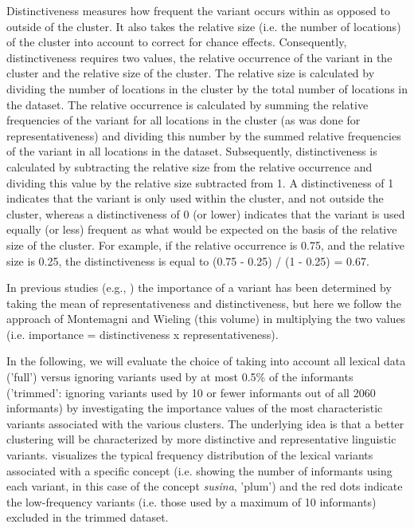 \documentclass[output=paper]{LSP/langsci}
\begin{document}
Distinctiveness measures how frequent the variant occurs within as opposed to outside of the cluster. It also takes the relative size (i.e. the number of locations) of the cluster into account to correct for chance effects. Consequently, distinctiveness requires two values, the relative occurrence of the variant in the cluster and the relative size of the cluster. The relative size is calculated by dividing the number of locations in the cluster by the total number of locations in the dataset. The relative occurrence is calculated by summing the relative frequencies of the variant for all locations in the cluster (as was done for representativeness) and dividing this number by the summed relative frequencies of the variant in all locations in the dataset. Subsequently, distinctiveness is calculated by subtracting the relative size from the relative occurrence and dividing this value by the relative size subtracted from 1. A distinctiveness of 1 indicates that the variant is only used within the cluster, and not outside the cluster, whereas a distinctiveness of 0 (or lower) indicates that the variant is used equally (or less) frequent as what would be expected on the basis of the relative size of the cluster. For example, if the relative occurrence is 0.75, and the relative size is 0.25, the distinctiveness is equal to (0.75 - 0.25) / (1 - 0.25) = 0.67. 

In previous studies (e.g., \citealt{wieling_analyzing_2014}) the importance of a variant has been determined by taking the mean of representativeness and distinctiveness, but here we follow the approach of Montemagni and Wieling (this volume) in multiplying the two values (i.e. importance = distinctiveness x representativeness).

In the following, we will evaluate the choice of taking into account all lexical data ('full') versus ignoring variants used by at most 0.5\% of the informants ('trimmed': ignoring variants used by 10 or fewer informants out of all 2060 informants) by investigating the importance values of the most characteristic variants associated with the various clusters. The underlying idea is that a better clustering will be characterized by more distinctive and representative linguistic variants.  visualizes the typical frequency distribution of the lexical variants associated with a specific concept (i.e. showing the number of informants using each variant, in this case of the concept \textit{susina}, 'plum') and the red dots indicate the low-frequency variants (i.e. those used by a maximum of 10 informants) excluded in the trimmed dataset.
\end{document}
